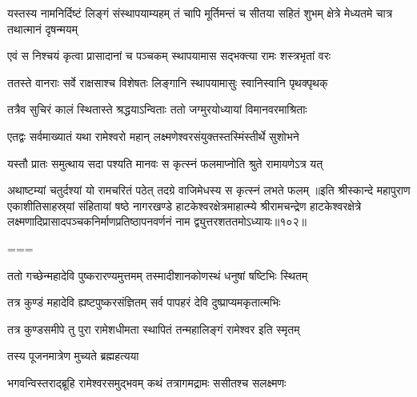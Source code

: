 \threelineshloka
{यस्तस्य नामनिर्दिष्टं लिङ्गं संस्थापयाम्यहम्}
{तं चापि मूर्तिमन्तं च सीतया सहितं शुभम्}
{क्षेत्रे मेध्यतमे चात्र तथात्मानं दृषन्मयम्}%

\twolineshloka
{एवं स निश्चयं कृत्वा प्रासादानां च पञ्चकम्}
{स्थापयामास सद्भक्त्या रामः शस्त्रभृतां वरः}%

\twolineshloka
{ततस्ते वानराः सर्वे राक्षसाश्च विशेषतः}
{लिङ्गानि स्थापयामासुः स्वानिस्वानि पृथक्पृथक्}%

\twolineshloka
{तत्रैव सुचिरं कालं स्थितास्ते श्रद्धयाऽन्विताः}
{ततो जग्मुरयोध्यायां विमानवरमाश्रिताः}%

\twolineshloka
{एतद्वः सर्वमाख्यातं यथा रामेश्वरो महान्}
{लक्ष्मणेश्वरसंयुक्तस्तस्मिंस्तीर्थे सुशोभने}%

\twolineshloka
{यस्तौ प्रातः समुत्थाय सदा पश्यति मानवः}
{स कृत्स्नं फलमाप्नोति श्रुते रामायणेऽत्र यत्}%

\twolineshloka
{अथाष्टम्यां चतुर्दश्यां यो रामचरितं पठेत्}
{तदग्रे वाजिमेधस्य स कृत्स्नं लभते फलम्}%
॥इति श्रीस्कान्दे महापुराण एकाशीतिसाहस्र्यां संहितायां षष्ठे नागरखण्डे हाटकेश्वरक्षेत्रमाहात्म्ये श्रीरामचन्द्रेण हाटकेश्वरक्षेत्रे लक्ष्मणादिप्रासादपञ्चकनिर्माणप्रतिष्ठापनवर्णनं नाम द्व्युत्तरशततमोऽध्यायः॥१०२॥

===


\vakta{}
\shrota{}
\tags{}
\notes{}

\storymeta





\twolineshloka
{ततो गच्छेन्महादेवि पुष्करारण्यमुत्तमम्}
{तस्मादीशानकोणस्थं धनुषां षष्टिभिः स्थितम्}%

\twolineshloka
{तत्र कुण्डं महादेवि ह्यष्टपुष्करसंज्ञितम्}
{सर्व पापहरं देवि दुष्प्राप्यमकृतात्मभिः}%

\twolineshloka
{तत्र कुण्डसमीपे तु पुरा रामेशधीमता}
{स्थापितं तन्महालिङ्गं रामेश्वर इति स्मृतम्}%

\onelineshloka
{तस्य पूजनमात्रेण मुच्यते ब्रह्महत्यया}%


\twolineshloka
{भगवन्विस्तराद्ब्रूहि रामेश्वरसमुद्भवम्}
{कथं तत्रागमद्रामः ससीतश्च सलक्ष्मणः}%

